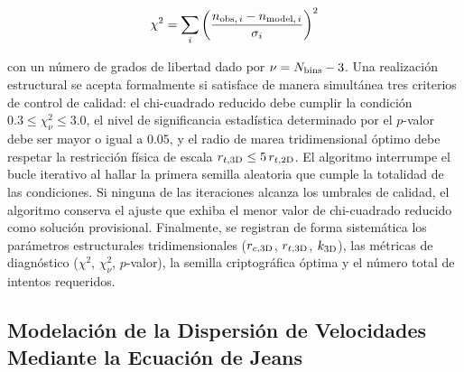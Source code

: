         $$\chi^2 = \sum_i \left(\frac{n_{{\rm obs}, \, i} - 
        n_{{\rm model}, \, i}}{\sigma_i}\right)^2$$
        
        con un número de grados de libertad dado por $\nu = N_{\rm bins} - 3$. 
        Una realización estructural se acepta formalmente si satisface de manera 
        simultánea tres criterios de control de calidad: el chi-cuadrado 
        reducido debe cumplir la condición $0.3 \leq \chi^2_\nu \leq 3.0$, el 
        nivel de significancia estadística determinado por el $p$-valor debe ser 
        mayor o igual a $0.05$, y el radio de marea tridimensional óptimo debe 
        respetar la restricción física de escala $r_{t,\rm 3D} \leq 
        5\,r_{t,\rm 2D}$. El algoritmo interrumpe el bucle iterativo al hallar 
        la primera semilla aleatoria que cumple la totalidad de las condiciones. 
        Si ninguna de las iteraciones alcanza los umbrales de calidad, el 
        algoritmo conserva el ajuste que exhiba el menor valor de chi-cuadrado 
        reducido como solución provisional. Finalmente, se registran de forma 
        sistemática los parámetros estructurales tridimensionales 
        ($r_{c,\rm 3D}$, $r_{t,\rm 3D}$, $k_{\rm 3D}$), las métricas de 
        diagnóstico ($\chi^2$, $\chi^2_\nu$, $p$-valor), la semilla 
        criptográfica óptima y el número total de intentos requeridos.

    \subsection{
        Modelación de la Dispersión de Velocidades Mediante la Ecuación de Jeans
        }

